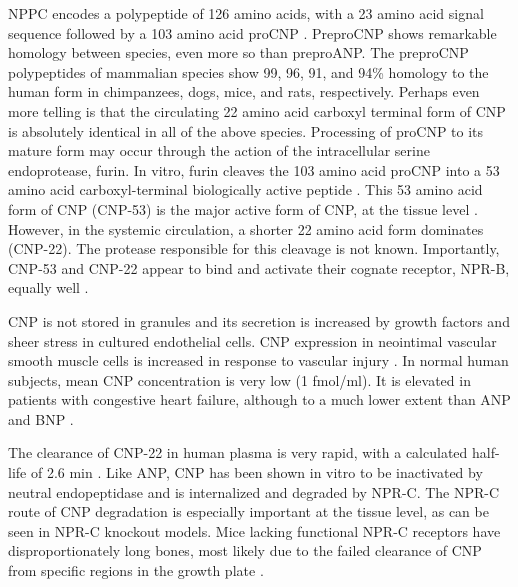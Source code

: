 \documentclass[14pt,a4paper,onecolumn]{extarticle}
\begin{document}
NPPC encodes a polypeptide of 126 amino acids, with a 23 amino acid signal sequence followed by a 103 amino acid proCNP \citep{Tawaragi1991}. PreproCNP shows remarkable homology between species, even more so than preproANP. The preproCNP polypeptides of mammalian species show 99, 96, 91, and 94\% homology to the human form in chimpanzees, dogs, mice, and rats, respectively. Perhaps even more telling is that the circulating 22 amino acid carboxyl terminal form of CNP is absolutely identical in all of the above species. Processing of proCNP to its mature form may occur through the action of the intracellular serine endoprotease, furin. In vitro, furin cleaves the 103 amino acid proCNP into a 53 amino acid carboxyl-terminal biologically active peptide \citep{Wu2003}. This 53 amino acid form of CNP (CNP-53) is the major active form of CNP, at the tissue level \citep{Brown1997}. However, in the systemic circulation, a shorter 22 amino acid form dominates (CNP-22). The protease responsible for this cleavage is not known. Importantly, CNP-53 and CNP-22 appear to bind and activate their cognate receptor, NPR-B, equally well \citep{Yeung1996}.

CNP is not stored in granules and its secretion is increased by growth factors \citep{Suga1993} \citep{Suga1992b} and sheer stress \citep{Chun1997} in cultured endothelial cells. CNP expression in neointimal vascular smooth muscle cells is increased in response to vascular injury \citep{Brown1997}. In normal human subjects, mean CNP concentration is very low (1 fmol/ml). It is elevated in patients with congestive heart failure, although to a much lower extent than ANP and BNP \citep{Charles2006} \citep{Del-Ry2005} \citep{Kalra2003}.

The clearance of CNP-22 in human plasma is very rapid, with a calculated half-life of 2.6 min \citep{Hunt1994}. Like ANP, CNP has been shown in vitro to be inactivated by neutral endopeptidase \citep{Kenny1993} and is internalized and degraded by NPR-C. The NPR-C route of CNP degradation is especially important at the tissue level, as can be seen in NPR-C knockout models. Mice lacking functional NPR-C receptors have disproportionately long bones, most likely due to the failed clearance of CNP from specific regions in the growth plate \citep{Jaubert1999} \citep{Matsukawa1999}.
\end{document}
